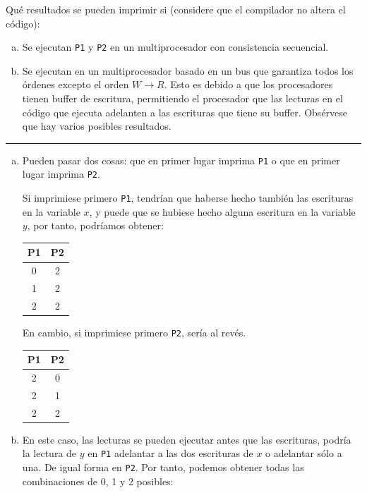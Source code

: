 \documentclass[10pt,a4paper,spanish]{report}
\begin{document}
Qué resultados se pueden imprimir si (considere que el compilador no altera el código):
\begin{enumerate}[a)]
    \item Se ejecutan \verb*|P1| y \verb*|P2| en un multiprocesador con consistencia secuencial.
    \item Se ejecutan en un multiprocesador basado en un bus que garantiza todos los órdenes excepto el orden $W \rightarrow R$. Esto es debido a que los procesadores tienen buffer de escritura, permitiendo el procesador que las lecturas en el código que ejecuta adelanten a las escrituras que tiene su buffer. Obsérvese que hay varios posibles resultados.
\end{enumerate}

\rule{\linewidth}{0.05mm}

\begin{enumerate}[a)]
    \item Pueden pasar dos cosas: que en primer lugar imprima \verb*|P1| o que en primer lugar imprima \verb*|P2|.

    Si imprimiese primero \verb*|P1|, tendrían que haberse hecho también las escrituras en la variable $x$, y puede que se hubiese hecho alguna escritura en la variable $y$, por tanto, podríamos obtener:

    \begin{center}
    \begin{tabular}{c|c}
    P1 & P2 \\
    \hline
    0 & 2 \\
    1 & 2 \\
    2 & 2 \\
    \end{tabular}
    \end{center}

    En cambio, si imprimiese primero \verb*|P2|, sería al revés.

    \begin{center}
    \begin{tabular}{c|c}
    P1 & P2 \\
    \hline
    2 & 0 \\
    2 & 1 \\
    2 & 2 \\
    \end{tabular}
    \end{center}

    \item En este caso, las lecturas se pueden ejecutar antes que las escrituras, podría la lectura de $y$ en \verb*|P1| adelantar a las dos escrituras de $x$ o adelantar sólo a una. De igual forma en \verb*|P2|. Por tanto, podemos obtener todas las combinaciones de 0, 1 y 2 posibles:


\end{enumerate}
\end{document}
